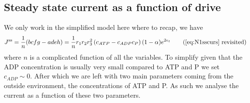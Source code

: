 \documentclass[11pt]{article}
\begin{document}
\subsection{Steady state current as a function of drive}
We only work in the simplified model here where to recap, we have
\begin{equation}
	J^\text{ss} = \frac{1}{n}(bcfg-adeh) = \frac{1}{n}r_1r_2r_3^{2} \left( c_{ATP} - c_{ADP} c_P \right) (1 - \alpha) e^{2 \epsilon_t} \tag{\ref{eq:N1sscurs} revisited}
\end{equation}
where $n$ is a complicated function of all the variables.
To simplify given that the ADP concentration is usually very small compared to ATP and P we set $c_{ADP} \sim 0$.
After which we are left with two main parameters coming from the outside environment, the concentrations of ATP and P.
As such we analyse the current as a function of these two parameters.
\end{document}
